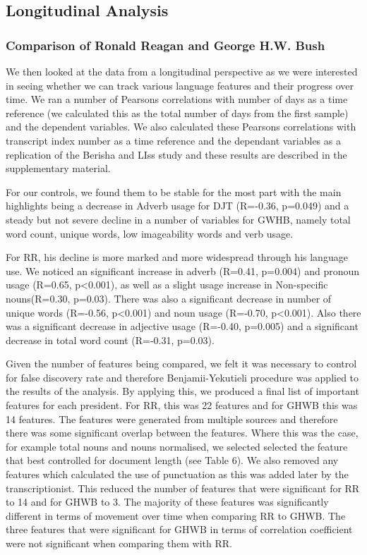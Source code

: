 \documentclass[12pt]{article}
\begin{document}
\subsection{Longitudinal Analysis}
\subsubsection{Comparison of Ronald Reagan and George H.W. Bush}
We then looked at the data from a longitudinal perspective as we were interested in seeing whether we can track various language features and their progress over time. We ran a number of Pearsons correlations with number of days as a time reference (we calculated this as the total number of days from the first sample) and the dependent variables. We also calculated these Pearsons correlations with transcript index number as a time reference and the dependant variables as a replication of the Berisha and LIss study \cite{Berisha2015} and these results are described in the supplementary material.
\par 
For our controls, we found them to be stable for the most part with the main highlights being a decrease in Adverb usage for DJT (R=-0.36, p=0.049) and a steady but not severe decline in a number of variables for GWHB, namely total word count, unique words, low imageability words and verb usage.
\par 
For RR, his decline is more marked and more widespread through his language use. We noticed an significant increase in adverb (R=0.41, p=0.004) and pronoun usage (R=0.65, p\textless0.001), as well as a slight usage increase in Non-specific nouns(R=0.30, p=0.03). There was also a significant decrease in number of unique words (R=-0.56, p\textless0.001) and noun usage (R=-0.70, p\textless0.001). Also there was a significant decrease in adjective usage (R=-0.40, p=0.005) and a significant decrease in total word count (R=-0.31, p=0.03). 
\par
Given the number of features being compared, we felt it was necessary to control for false discovery rate and therefore Benjamii-Yekutieli procedure was applied to the results of the analysis. By applying this, we produced a final list of important features for each president. For RR, this was 22 features and for GHWB this was 14 features.  The features were generated from multiple sources and therefore there was some significant overlap between the features. Where this was the case, for example total nouns and nouns normalised,  we selected selected the feature that best controlled for document length (see Table 6). We also removed any features which calculated the use of punctuation as this was added later by the transcriptionist. This reduced the number of features that were significant for RR to 14 and for GHWB to 3. The majority of these features was significantly different in terms of movement over time when comparing RR to GHWB. The three features that were significant for GHWB in terms of correlation coefficient were not significant when comparing them with RR.
\end{document}
